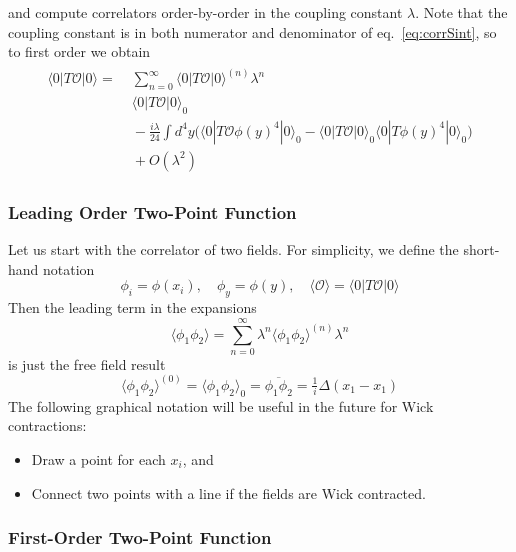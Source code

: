 and compute correlators order-by-order in the coupling constant
$\lambda$. Note that the coupling constant is in both numerator and
denominator of eq.~\eqref{eq:corrSint}, so to first order we obtain
\begin{multline}
  \begin{split}
    \langle 0|T\mathcal{O}|0\rangle = &\;
    \sum_{n=0}^\infty \langle 0|T\mathcal{O}|0\rangle^{(n)} \lambda^n
    \\ &\;
    \langle 0|T\mathcal{O}|0\rangle_0 
    \\ &\;
    - \frac{i\lambda}{24} \int d^4y \Big(
    \langle 0|T\mathcal{O} \phi(y)^4 |0\rangle_0 - 
    \langle 0|T\mathcal{O} |0\rangle_0 
    \langle 0|T \phi(y)^4 |0\rangle_0 
    \Big)
    \\ &\;
    + O(\lambda^2)
  \end{split}
\end{multline}


\subsubsection{Leading Order Two-Point Function}

Let us start with the correlator of two fields. For simplicity, we
define the short-hand notation
\begin{equation}
  \phi_i = \phi(x_i)
  ,\quad
  \phi_y = \phi(y)
  ,\quad
  \langle \mathcal{O} \rangle = \langle 0|T \mathcal{O} |0\rangle
\end{equation}
Then the leading term in the expansions
\begin{equation}
  \langle \phi_1 \phi_2 \rangle = 
  \sum_{n=0}^\infty \lambda^n \langle \phi_1 \phi_2 \rangle^{(n)}
  \lambda^n
\end{equation}
is just the free field result
\begin{equation}
  \langle \phi_1 \phi_2 \rangle^{(0)}
  = 
  \langle \phi_1 \phi_2 \rangle_0
  = 
  \overline{\phi_1 \phi_2}
  = 
  \tfrac{1}{i} \Delta(x_1 - x_1)
\end{equation}
The following graphical notation will be useful in the future for Wick
contractions:
\begin{itemize}
\item Draw a point for each $x_i$, and
\item Connect two points with a line if the fields are Wick contracted.
\end{itemize}


\subsubsection{First-Order Two-Point Function}

